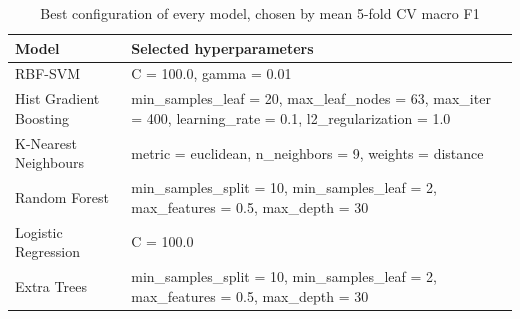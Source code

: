 \begin{table}[htbp]
\centering
\footnotesize
\caption{Best configuration of every model, chosen by mean 5-fold CV macro F1}
\label{tab:best_params}
\begin{tabular}{p{}p{}}
\toprule
Model & Selected hyperparameters \\
\midrule
RBF-SVM & C = 100.0, gamma = 0.01 \\
Hist Gradient Boosting & min\_samples\_leaf = 20, max\_leaf\_nodes = 63, max\_iter = 400, learning\_rate = 0.1, l2\_regularization = 1.0 \\
K-Nearest Neighbours & metric = euclidean, n\_neighbors = 9, weights = distance \\
Random Forest & min\_samples\_split = 10, min\_samples\_leaf = 2, max\_features = 0.5, max\_depth = 30 \\
Logistic Regression & C = 100.0 \\
Extra Trees & min\_samples\_split = 10, min\_samples\_leaf = 2, max\_features = 0.5, max\_depth = 30 \\
\bottomrule
\end{tabular}
\end{table}
